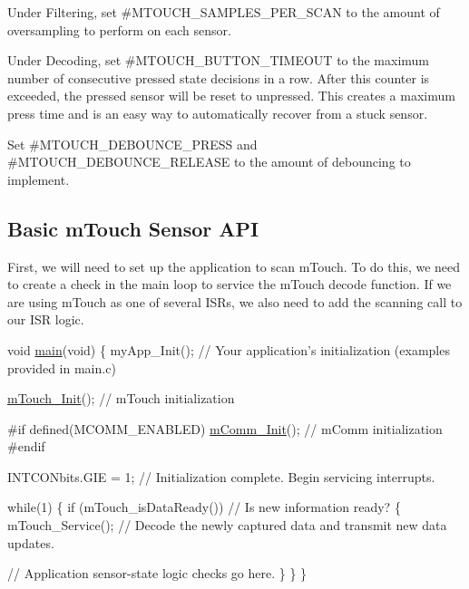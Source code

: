 \begin{DoxyEnumerate}
\begin{DoxyEnumerate}
\end{DoxyEnumerate}
\item Under \textquotesingle{}Filtering\textquotesingle{}, set \#\+M\+T\+O\+U\+C\+H\+\_\+\+S\+A\+M\+P\+L\+E\+S\+\_\+\+P\+E\+R\+\_\+\+S\+C\+A\+N to the amount of oversampling to perform on each sensor. 
\item Under \textquotesingle{}Decoding\textquotesingle{}, set \#\+M\+T\+O\+U\+C\+H\+\_\+\+B\+U\+T\+T\+O\+N\+\_\+\+T\+I\+M\+E\+O\+U\+T to the maximum number of consecutive \textquotesingle{}pressed\textquotesingle{} state decisions in a row. After this counter is exceeded, the pressed sensor will be reset to unpressed. This creates a maximum press time and is an easy way to automatically recover from a stuck sensor. 
\item Set \#\+M\+T\+O\+U\+C\+H\+\_\+\+D\+E\+B\+O\+U\+N\+C\+E\+\_\+\+P\+R\+E\+S\+S and \#\+M\+T\+O\+U\+C\+H\+\_\+\+D\+E\+B\+O\+U\+N\+C\+E\+\_\+\+R\+E\+L\+E\+A\+S\+E to the amount of debouncing to implement. 
\end{DoxyEnumerate}\hypertarget{feat_basic_featBasic-Out}{}\subsection{Basic m\+Touch Sensor A\+P\+I}\label{feat_basic_featBasic-Out}
First, we will need to set up the application to scan m\+Touch. To do this, we need to create a check in the main loop to service the m\+Touch decode function. If we are using m\+Touch as one of several I\+S\+Rs, we also need to add the scanning call to our I\+S\+R logic.


\begin{DoxyCode}
\textcolor{keywordtype}{void} \hyperlink{_graphics_2_g_d_d_2_default___template_2_main_8c_a840291bc02cba5474a4cb46a9b9566fe}{main}(\textcolor{keywordtype}{void})
\{
    myApp\_Init();                       \textcolor{comment}{// Your application's initialization (examples provided in main.c)}

    \hyperlink{m_touch_8c_ab73968cbb19d4ae25a65698c15906b65}{mTouch\_Init}();                      \textcolor{comment}{// mTouch initialization}

\textcolor{preprocessor}{    #if defined(MCOMM\_ENABLED)}
    \hyperlink{m_comm_8c_ae411cd73970859fd79070afa9a1cb319}{mComm\_Init}();                       \textcolor{comment}{// mComm initialization}
\textcolor{preprocessor}{    #endif}

    INTCONbits.GIE = 1;                 \textcolor{comment}{// Initialization complete. Begin servicing interrupts.}

    \textcolor{keywordflow}{while}(1)
    \{
        \textcolor{keywordflow}{if} (mTouch\_isDataReady())       \textcolor{comment}{// Is new information ready?}
        \{
            mTouch\_Service();           \textcolor{comment}{// Decode the newly captured data and transmit new data updates.}
            
            \textcolor{comment}{// Application sensor-state logic checks go here.}
        \}
    \}
\}
\end{DoxyCode}



